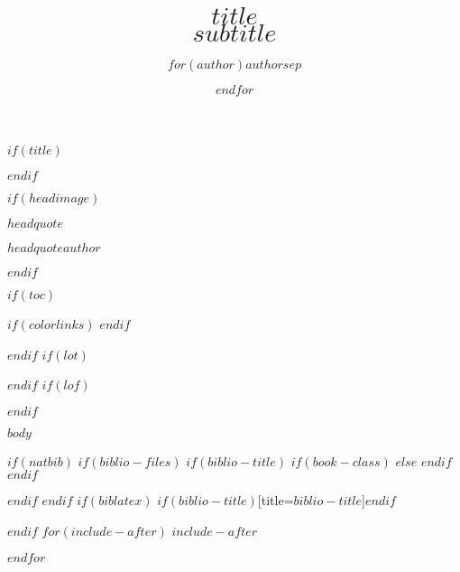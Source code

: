 \documentclass[$if(fontsize)$$fontsize$,$endif$$if(lang)$$babel-lang$,$endif$$if(papersize)$$papersize$paper,$endif$$for(classoption)$$classoption$$sep$,$endfor$]{tufte-handout}
\date{}
\title{$title$ \\ \small $subtitle$}
\author{$for(author)$$author$$sep$ \and $endfor$}
\newcommand\crule[3][black]{\textcolor{#1}{\rule{#2}{#3}}}
\begin{document}
$if(title)$
\maketitle
$endif$




$if(headimage)$
\begin{marginfigure}
\epigraph{$headquote$}{\textit{$headquoteauthor$}}
\end{marginfigure}
$endif$




$if(toc)$
{
$if(colorlinks)$
\hypersetup{linkcolor=$if(toccolor)$$toccolor$$else$black$endif$}
$endif$
\setcounter{tocdepth}{$toc-depth$}
\tableofcontents
}
$endif$
$if(lot)$
\listoftables
$endif$
$if(lof)$
\listoffigures
$endif$

$body$



$if(natbib)$
$if(biblio-files)$
$if(biblio-title)$
$if(book-class)$
\renewcommand\bibname{$biblio-title$}
$else$
\renewcommand\refname{$biblio-title$}
$endif$
$endif$



$endif$
$endif$
$if(biblatex)$
\printbibliography$if(biblio-title)$[title=$biblio-title$]$endif$

$endif$
$for(include-after)$
$include-after$

$endfor$
\end{document}
